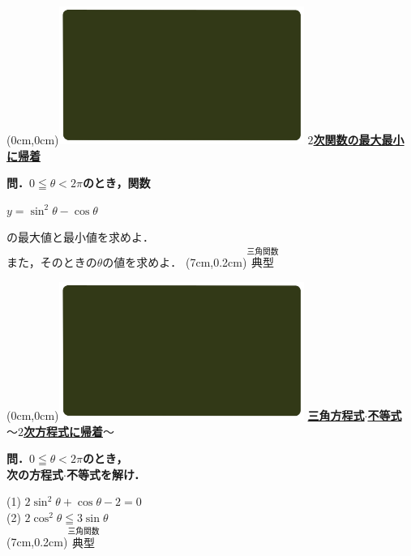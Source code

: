 \documentclass[10pt,
fleqn,
dvipdfmx,
uplatex
]{jsarticle}
\begin{document}
\at(0cm,0cm){\includegraphics[width=8cm,bb=0 0 1920 1080]{./youtube/thumbnails/templates/smart_background/三角関数.jpeg}}
{\color{orange}\bf\boldmath\Large\underline{$2$次関数の最大最小に帰着}}\vspace{0.3zw}

\large 
\bf\boldmath 問．$0\leqq \theta <2\pi$のとき，関数

\Huge
\hspace{0.1zw}
$y=\sin ^2\theta -\cos \theta$

\large 
\vspace{0.8zw}
の最大値と最小値を求めよ．\\
\hfill また，そのときの$\theta$の値を求めよ．
\at(7cm,0.2cm){\small\color{bradorange}$\overset{\text{三角関数}}{\text{典型}}$}

\newpage

\at(0cm,0cm){\includegraphics[width=8cm,bb=0 0 1920 1080]{./youtube/thumbnails/templates/smart_background/三角関数.jpeg}}
{\color{orange}\bf\boldmath\normalsize\underline{三角方程式$\cdot$不等式$〜2$次方程式に帰着$〜$}}\vspace{0.3zw}

\large 
\bf\boldmath 問．$0\leqq \theta <2\pi$のとき，\\
\hfill 次の方程式$\cdot$不等式を解け．

\LARGE
(1)  $2\sin ^2\theta +\cos \theta -2=0$\\
(2)  $2\cos ^2\theta \leqq 3\sin \theta$\\

\at(7cm,0.2cm){\small\color{bradorange}$\overset{\text{三角関数}}{\text{典型}}$}
\end{document}
